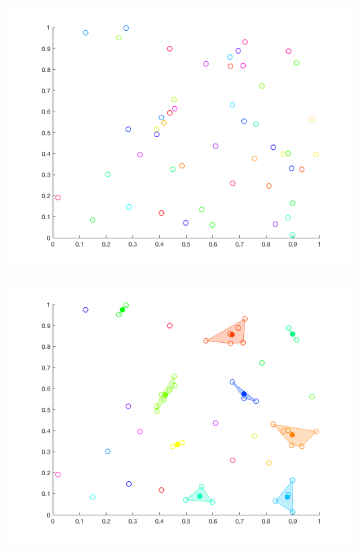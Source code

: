 \documentclass[12pt]{article}
\begin{document}
\begin{figure}[t!]
    \centering
    \begin{subfigure}[b]{0.3\textwidth}
        \includegraphics[width=\textwidth]{ha_1}
    \end{subfigure}
    \begin{subfigure}[b]{0.3\textwidth}
        \includegraphics[width=\textwidth]{ha_2}
    \end{subfigure}
    \begin{subfigure}[b]{0.3\textwidth}

\end{subfigure}
\end{figure}
\end{document}
